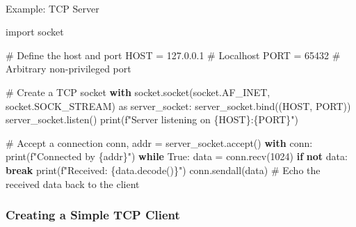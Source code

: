 \documentclass[
  letterpaper,
  DIV=11,
  numbers=noendperiod]{scrreprt}
\makeatletter
\let\oldparagraph\paragraph
\renewcommand{\paragraph}{
    \@ifstar
      \xxxParagraphStar
      \xxxParagraphNoStar
  }
\newcommand{\xxxParagraphStar}[1]{\oldparagraph*{#1}\mbox{}}
\newcommand{\xxxParagraphNoStar}[1]{\oldparagraph{#1}\mbox{}}
\newenvironment{Shaded}{\begin{snugshade}}{\end{snugshade}}
\newcommand{\BuiltInTok}[1]{\textcolor[rgb]{0.00,0.23,0.31}{#1}}
\newcommand{\CommentTok}[1]{\textcolor[rgb]{0.37,0.37,0.37}{#1}}
\newcommand{\ControlFlowTok}[1]{\textcolor[rgb]{0.00,0.23,0.31}{\textbf{#1}}}
\newcommand{\DecValTok}[1]{\textcolor[rgb]{0.68,0.00,0.00}{#1}}
\newcommand{\ImportTok}[1]{\textcolor[rgb]{0.00,0.46,0.62}{#1}}
\newcommand{\KeywordTok}[1]{\textcolor[rgb]{0.00,0.23,0.31}{\textbf{#1}}}
\newcommand{\NormalTok}[1]{\textcolor[rgb]{0.00,0.23,0.31}{#1}}
\newcommand{\OperatorTok}[1]{\textcolor[rgb]{0.37,0.37,0.37}{#1}}
\newcommand{\SpecialCharTok}[1]{\textcolor[rgb]{0.37,0.37,0.37}{#1}}
\newcommand{\SpecialStringTok}[1]{\textcolor[rgb]{0.13,0.47,0.30}{#1}}
\newcommand{\StringTok}[1]{\textcolor[rgb]{0.13,0.47,0.30}{#1}}
\newcommand{\VariableTok}[1]{\textcolor[rgb]{0.07,0.07,0.07}{#1}}
\makeatother
\begin{document}
\paragraph{Example: TCP Server}\label{example-tcp-server}

\begin{Shaded}
\begin{Highlighting}[]
\ImportTok{import}\NormalTok{ socket}

\CommentTok{\# Define the host and port}
\NormalTok{HOST }\OperatorTok{=} \StringTok{\textquotesingle{}127.0.0.1\textquotesingle{}}  \CommentTok{\# Localhost}
\NormalTok{PORT }\OperatorTok{=} \DecValTok{65432}        \CommentTok{\# Arbitrary non{-}privileged port}

\CommentTok{\# Create a TCP socket}
\ControlFlowTok{with}\NormalTok{ socket.socket(socket.AF\_INET, socket.SOCK\_STREAM) }\ImportTok{as}\NormalTok{ server\_socket:}
\NormalTok{    server\_socket.bind((HOST, PORT))}
\NormalTok{    server\_socket.listen()}
    \BuiltInTok{print}\NormalTok{(}\SpecialStringTok{f"Server listening on }\SpecialCharTok{\{}\NormalTok{HOST}\SpecialCharTok{\}}\SpecialStringTok{:}\SpecialCharTok{\{}\NormalTok{PORT}\SpecialCharTok{\}}\SpecialStringTok{"}\NormalTok{)}

    \CommentTok{\# Accept a connection}
\NormalTok{    conn, addr }\OperatorTok{=}\NormalTok{ server\_socket.accept()}
    \ControlFlowTok{with}\NormalTok{ conn:}
        \BuiltInTok{print}\NormalTok{(}\SpecialStringTok{f"Connected by }\SpecialCharTok{\{}\NormalTok{addr}\SpecialCharTok{\}}\SpecialStringTok{"}\NormalTok{)}
        \ControlFlowTok{while} \VariableTok{True}\NormalTok{:}
\NormalTok{            data }\OperatorTok{=}\NormalTok{ conn.recv(}\DecValTok{1024}\NormalTok{)}
            \ControlFlowTok{if} \KeywordTok{not}\NormalTok{ data:}
                \ControlFlowTok{break}
            \BuiltInTok{print}\NormalTok{(}\SpecialStringTok{f"Received: }\SpecialCharTok{\{}\NormalTok{data}\SpecialCharTok{.}\NormalTok{decode()}\SpecialCharTok{\}}\SpecialStringTok{"}\NormalTok{)}
\NormalTok{            conn.sendall(data)  }\CommentTok{\# Echo the received data back to the client}
\end{Highlighting}
\end{Shaded}

\subsubsection{Creating a Simple TCP
Client}\label{creating-a-simple-tcp-client}
\end{document}
